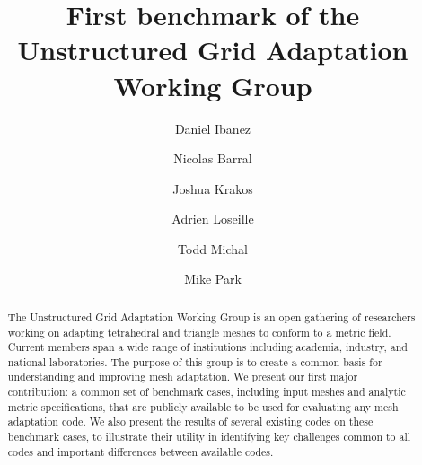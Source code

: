 \documentclass[3p,times,procedia,number]{elsarticle}
\begin{document}
\begin{frontmatter}




\title{First benchmark of the Unstructured Grid Adaptation Working Group}




\author[a]{Daniel Ibanez}
\author[b]{Nicolas Barral}
\author[c]{Joshua Krakos}
\author[d]{Adrien Loseille}
\author[c]{Todd Michal}
\author[e]{Mike Park}

\address[a]{Sandia National Laboratories, P.O. Box 5800, Albuquerque, NM 87185-1321, United States}
\address[b]{Department of Earth Science and Engineering, Imperial College London}
\address[c]{Boeing}
\address[d]{INRIA}
\address[e]{NASA Langley Research Center, Mail Stop 128, Hampton, VA 23681, United States}

\begin{abstract}
The Unstructured Grid Adaptation Working Group is an open gathering of researchers
working on adapting tetrahedral and triangle meshes to conform to a metric field.
Current members span a wide range of institutions including academia,
industry, and national laboratories.
The purpose of this group is to create a common basis for understanding and
improving mesh adaptation.
We present our first major contribution: a common set of benchmark cases,
including input meshes and analytic metric specifications, that are publicly
available to be used for evaluating any mesh adaptation code.
We also present the results of several existing codes on these benchmark
cases, to illustrate their utility in identifying key challenges common
to all codes and important differences between available codes.
\end{abstract}


\end{frontmatter}
\end{document}
